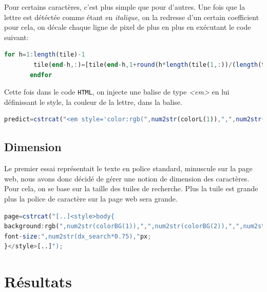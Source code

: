 \documentclass[a4paper,12pt,titlepage]{report}
\begin{document}
	Pour certains caractères, c'est plus simple que pour d'autres.
	Une fois que la lettre est détéctée comme étant en \textit{italique}, on la redresse d'un certain coefficient pour cela, on décale chaque ligne de pixel de plus en plus en exécutant le code suivant:
	\begin{lstlisting}[caption={Redressage de caractère dans Octave},language=Octave]
 for h=1:length(tile)-1
        tile(end-h,:)=[tile(end-h,1+round(h*length(tile(1,:))/(length(tile)*4.1)):end) tile(end-h,1:round(h*length(tile(1,:))/(length(tile)*4.1)))];
       endfor
\end{lstlisting}
		Cette fois dans le code \texttt{HTML}, on injecte une balise de type \textsl{<em>} en lui définissant le style, la couleur de la lettre, dans la balise.
\begin{lstlisting}[caption={Insertion d'un caractère italique dans Octave},language=Octave]
 predict=cstrcat("<em style='color:rgb(",num2str(colorL(1)),",",num2str(colorL(2)),",",num2str(colorL(3)),");'>",predict,"</em>");
\end{lstlisting}
		
	\subsection{Dimension}
	Le premier essai représentait le texte en police standard, minuscule sur la page web, nous avons donc décidé de gérer une notion de dimension des caractères. Pour cela, on se base sur la taille des tuiles de recherche. Plus la tuile est grande plus la police de caractère sur la page web sera grande.
\begin{lstlisting}[caption={Insertion de la couleur de fond dans Octave},language=Octave]
page=cstrcat("[..]<style>body{
background:rgb(",num2str(colorBG(1)),",",num2str(colorBG(2)),",",num2str(colorBG(3)),");
font-size:",num2str(dx_search*0.75),"px;
}</style>[..]");
\end{lstlisting}
	\section{Résultats}
\end{document}
